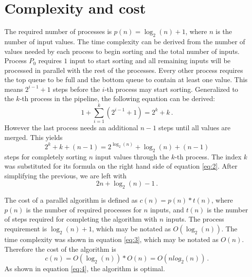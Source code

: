 \documentclass[pdftex, 11pt, a4paper, titlepage]{article}
\begin{document}
        \section{Complexity and cost}
        The required number of processes is $p(n) = \log_{2}(n)+1$, where $n$ is the number of input values. The time complexity
        can be derived from the number of values needed by each process to begin sorting and the total number of inputs.
        Process $P_0$ requires $1$ input to start sorting and all remaining inputs will be processed in parallel with the rest
        of the processes. Every other process requires the top queue to be full and the bottom queue to contain at least one value.
        This means $2^{i-1} + 1$ steps before the $i$-th process may start sorting. Generalized to the $k$-th process in the pipeline,
        the following equation can be derived:
        \begin{equation}\label{eq:1}
            1 + \sum_{i=1}^{k}(2^{i-1}+1) = 2^{k} + k\,.
        \end{equation}
        However the last process needs an additional $n-1$ steps until all values are merged. This yields
        \begin{equation}\label{eq:2}
            2^{k} + k + (n-1) = 2^{\log_{2}(n)} + \log_{2}(n) + (n-1)
        \end{equation}
        steps for completely sorting $n$ input values through the $k$-th process. The index $k$ was substituted for its formula
        on the right hand side of equation \ref{eq:2}. After simplifying the previous, we are left with
        \begin{equation}\label{eq:3}
            2n + \log_{2}(n) - 1\,.
        \end{equation}

        The cost of a parallel algorithm is defined as $c(n) = p(n) * t(n)$, where $p(n)$ is the number of required processes for $n$
        inputs, and $t(n)$ is the number of steps required for completing the algorithm with $n$ inputs. The process requirement is
        $\log_{2}(n)+1$, which may be notated as $O(\log_{2}(n))$. The time complexity was shown in equation \ref{eq:3},
        which may be notated as $O(n)$. Therefore the cost of the algorithm is
        \begin{equation}\label{eq:4}
            c(n) = O(\log_{2}(n)) * O(n) = O(nlog_{2}(n))\,.
        \end{equation}
        As shown in equation \ref{eq:4}, the algorithm is optimal.
\end{document}
